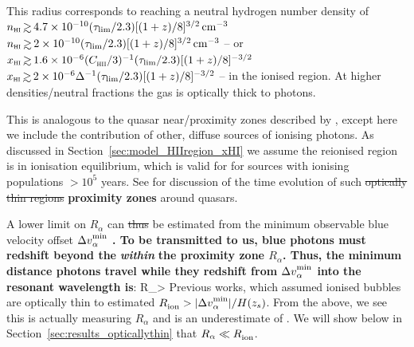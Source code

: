 \documentclass[fleqn,usenatbib]{mnras}
\providecommand{\DIFadd}[1]{{\protect\color{Green} \bf #1}} %
\providecommand{\DIFdel}[1]{{\protect\color{lightgray} \footnotesize \sout{#1}}} %
\providecommand{\DIFaddbegin}{} %
\providecommand{\DIFaddend}{} %
\providecommand{\DIFdelbegin}{} %
\providecommand{\DIFdelend}{} %
\newcommand{\DIFscaledelfig}{0.5}
\newlength{\DIFdelgraphicswidth} %
\newlength{\DIFdelgraphicsheight} %
\newcommand{\DIFaddincludegraphics}[2][]{{\color{blue}\fbox{\DIFOincludegraphics[#1]{#2}}}} %
\newcommand{\DIFdelincludegraphics}[2][]{%
\sbox{\DIFdelgraphicsbox}{\DIFOincludegraphics[#1]{#2}}%
\settoboxwidth{\DIFdelgraphicswidth}{\DIFdelgraphicsbox} %
\settoboxtotalheight{\DIFdelgraphicsheight}{\DIFdelgraphicsbox} %
\scalebox{\DIFscaledelfig}{%
\parbox[b]{\DIFdelgraphicswidth}{\usebox{\DIFdelgraphicsbox}\\[-\baselineskip] \rule{\DIFdelgraphicswidth}{0em}}\llap{\resizebox{\DIFdelgraphicswidth}{\DIFdelgraphicsheight}{%
\setlength{\unitlength}{\DIFdelgraphicswidth}%
\begin{picture}(1,1)%
\thicklines\linethickness{2pt} %
{\color[rgb]{1,0,0}\put(0,0){\framebox(1,1){}}}%
{\color[rgb]{1,0,0}\put(0,0){\line( 1,1){1}}}%
{\color[rgb]{1,0,0}\put(0,1){\line(1,-1){1}}}%
\end{picture}%
}\hspace*{3pt}}} %
} %
\DeclareRobustCommand{\DIFaddbegin}{\DIFOaddbegin \let\includegraphics\DIFaddincludegraphics} %
\DeclareRobustCommand{\DIFaddend}{\DIFOaddend \let\includegraphics\DIFOincludegraphics} %
\DeclareRobustCommand{\DIFdelbegin}{\DIFOdelbegin \let\includegraphics\DIFdelincludegraphics} %
\DeclareRobustCommand{\DIFdelend}{\DIFOaddend \let\includegraphics\DIFOincludegraphics} %
\begin{document}
This radius corresponds to reaching a neutral hydrogen number density of \DIFdelbegin \DIFdel{$n_\HI \simgt 4.7\times10^{-10} (\tau_\mathrm{lim}/2.3)[(1+z)/8]^{3/2}\cm^{-3}$ }\DIFdelend \DIFaddbegin \DIFadd{$n_\HI \simgt 2\times10^{-10} (\tau_\mathrm{lim}/2.3)[(1+z)/8]^{3/2}\cm^{-3}$ }\DIFaddend -- or \DIFdelbegin \DIFdel{$\xHI \simgt 1.6\times10^{-6} (\clump/3)^{-1} (\tau_\mathrm{lim}/2.3)[(1+z)/8]^{-3/2}$ }\DIFdelend \DIFaddbegin \DIFadd{$\xHI \simgt 2\times10^{-6} \Delta^{-1} (\tau_\mathrm{lim}/2.3)[(1+z)/8]^{-3/2}$ }\DIFaddend -- in the ionised region. At higher densities/neutral fractions the gas is optically thick to \lya photons.

This is analogous to the quasar near/proximity zones described by \citet{bolton2007c}, except here we include the contribution of other, diffuse sources of ionising photons. As discussed in Section~\ref{sec:model_HIIregion_xHI} we assume the reionised region is in ionisation equilibrium, which is valid for for sources with ionising populations $>10^5$ years. See \citet{Davies2019} for discussion of the time evolution of such \DIFdelbegin \DIFdel{optically thin regions }\DIFdelend \DIFaddbegin \DIFadd{proximity zones }\DIFaddend around quasars.

A lower limit on $R_\alpha$ can \DIFdelbegin \DIFdel{thus }\DIFdelend be estimated from the minimum observable blue \lya velocity offset $\DV^\mathrm{min}_\alpha$\DIFaddbegin \DIFadd{. To be transmitted to us, blue photons must redshift beyond the }\lya\DIFadd{\ resonant wavelength (i.e. $\DV_\alpha = 0$) }\textit{\DIFadd{within}} \DIFadd{the proximity zone $R_\alpha$. Thus, the minimum distance photons travel while they redshift from $\DV^\mathrm{min}_\alpha$ into the resonant wavelength is}\DIFaddend :
%
\BE \label{eqn:opticallythin_DV}
R_\alpha > 
\EE
%
Previous works, which assumed ionised bubbles are optically thin to \lya \citep[e.g.,][]{Matthee2018b,Hashimoto2018a} estimated $\Rion > |\DV^\mathrm{min}_\alpha|/H(z_s)$. From the above, we see this is actually measuring $R_\alpha$ and is an underestimate of \Rion. We will show below in Section~\ref{sec:results_opticallythin} that $R_\alpha \ll \Rion$. 

\end{document}

